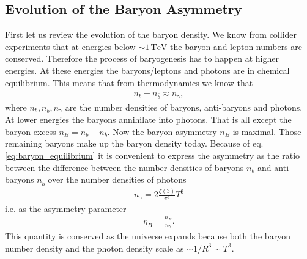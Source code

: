 \documentclass[13pt,a4paper,titlepage]{article}
\begin{document}
\subsection{Evolution of the Baryon Asymmetry}
\label{sec:evolution_of_the_baryon_asymmetry}
First let us review the evolution of the baryon density. We know from collider experiments that at energies below $\sim 1 \, \mathrm{TeV}$ the baryon and lepton numbers are conserved.
Therefore the process of baryogenesis has to happen at higher energies.
At these energies the baryons/leptons and photons are in chemical equilibrium.
This means that from thermodynamics we know that
\begin{align}
\label{eq:baryon_equilibrium}
n_b + n_{\bar{b}} \approx n_\gamma,
\end{align}
where $n_b, n_{\bar{b}}, n_\gamma$ are the number densities of baryons, anti-baryons and photons.
At lower energies the baryons annihilate into photons. That is all except the baryon excess $n_B = n_b - n_{\bar{b}}$. Now the baryon asymmetry $n_B$ is maximal. Those remaining baryons make up the baryon density today.
Because of eq. \eqref{eq:baryon_equilibrium} it is convenient to express the asymmetry as
the ratio between the difference between the number densities of baryons $n_b$ and anti-baryons $n_{\hat{b}}$
over the number densities of photons \cite[eq. 3.52]{the_early_universe_kolb_and_turner}
\begin{align}
    n_\gamma = 2 \frac{\zeta(3)}{\pi^2} T^3
\end{align}
i.e. as the asymmetry parameter \cite[eq. 1.2]{Cline:2006ts_Baryogenesis}
\begin{align}
    \eta_B = \frac{n_B}{n_\gamma}.
\end{align}
This quantity is conserved as the universe expands because both the baryon number density
and the photon density scale as $\sim 1/R^3 \sim T^3$.
\end{document}
